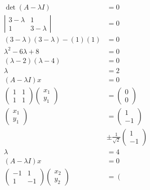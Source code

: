 \documentclass[main.tex]{subfiles}
\begin{document}
\begin{enumerate}
    $$
    \begin{aligned}
    \operatorname{det}(A-\lambda I) &=0 \\
    \left|\begin{array}{cc}
    3-\lambda & 1 \\
    1 & 3-\lambda
    \end{array}\right| &=0 \\
    (3-\lambda)(3-\lambda)-(1)(1) &=0 \\
    \lambda^{2}-6 \lambda+8 &=0\\
    (\lambda-2)(\lambda-4)&=0 \\
    \lambda &= 2\\
    (A-\lambda I) x &=0\\
    \left(\begin{array}{ll}
    1 & 1 \\
    1 & 1
    \end{array}\right)\left(\begin{array}{l}
    x_{1} \\
    y_{1}
    \end{array}\right) &=\left(\begin{array}{l}
    0 \\
    0
    \end{array}\right) \\
    \left(\begin{array}{l}
    x_{1} \\
    y_{1}
    \end{array}\right) &=\left(\begin{array}{l}
    1 \\
    -1
    \end{array}\right)\\
    & \pm \frac{1}{\sqrt{2}}\left(\begin{array}{l}
    1 \\
    -1
    \end{array}\right)\\
    \lambda &= 4\\
    (A-\lambda I) x &=0\\
    \left(\begin{array}{cc}
    -1 & 1 \\
    1 & -1
    \end{array}\right)\left(\begin{array}{l}
    x_{2} \\
    y_{2}
    \end{array}\right) &=\left(\begin{array}{l}

\end{array}
\end{aligned}$$
\end{enumerate}
\end{document}
